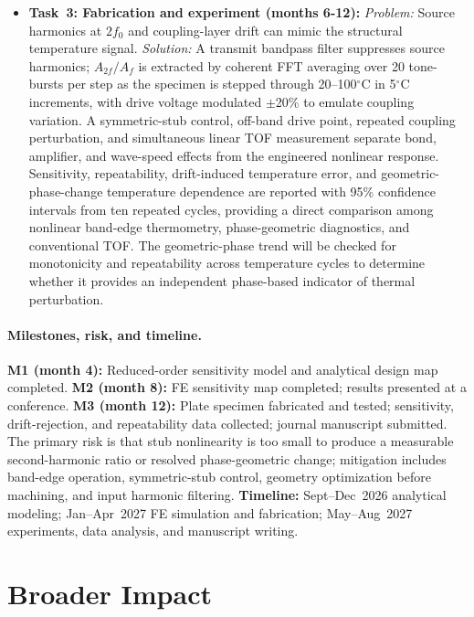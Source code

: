 \documentclass[11pt]{article}
\begin{document}
\begin{itemize}[noitemsep]
  \item \textbf{Task~3: Fabrication and experiment (months 6-12):} \emph{Problem:} Source harmonics at $2f_0$ and coupling-layer drift can mimic the structural temperature signal. \emph{Solution:} A transmit bandpass filter suppresses source harmonics; $A_{2f}/A_f$ is extracted by coherent FFT averaging over 20 tone-bursts per step as the specimen is stepped through 20--100$^\circ$C in 5$^\circ$C increments, with drive voltage modulated $\pm$20\% to emulate coupling variation. A symmetric-stub control, off-band drive point, repeated coupling perturbation, and simultaneous linear TOF measurement separate bond, amplifier, and wave-speed effects from the engineered nonlinear response. Sensitivity, repeatability, drift-induced temperature error, and geometric-phase-change temperature dependence are reported with 95\% confidence intervals from ten repeated cycles, providing a direct comparison among nonlinear band-edge thermometry, phase-geometric diagnostics, and conventional TOF. The geometric-phase trend will be checked for monotonicity and repeatability across temperature cycles to determine whether it provides an independent phase-based indicator of thermal perturbation.
\end{itemize}

\paragraph{Milestones, risk, and timeline.}
\textbf{M1 (month 4):} Reduced-order sensitivity model and analytical design map completed. \textbf{M2 (month 8):} FE sensitivity map completed; results presented at a conference. \textbf{M3 (month 12):} Plate specimen fabricated and tested; sensitivity, drift-rejection, and repeatability data collected; journal manuscript submitted. The primary risk is that stub nonlinearity is too small to produce a measurable second-harmonic ratio or resolved phase-geometric change; mitigation includes band-edge operation, symmetric-stub control, geometry optimization before machining, and input harmonic filtering. \textbf{Timeline:} Sept--Dec~2026 analytical modeling; Jan--Apr~2027 FE simulation and fabrication; May--Aug~2027 experiments, data analysis, and manuscript writing.


\section{Broader Impact}
\end{document}
